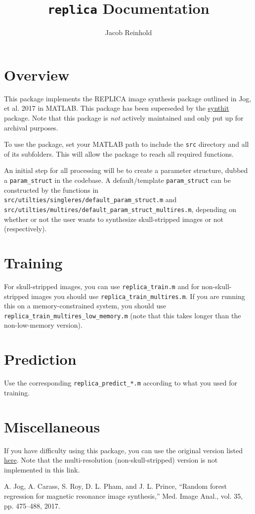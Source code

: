 \documentclass[12pt]{article}
\title{\texttt{replica} Documentation}
\author{Jacob Reinhold}
\begin{document}
\maketitle

\section{Overview}

This package implements the REPLICA image synthesis package outlined in Jog, et
al. 2017 \cite{jog} in MATLAB. This package has been superseded by the
\href{https://github.com/jcreinhold/synthit}{synthit} package. Note that this
package is \emph{not} actively maintained and only put up for archival purposes.

To use the package, set your MATLAB path to include the \texttt{src} directory
and all of its subfolders. This will allow the package to reach all required 
functions.

An initial step for all processing will be to create a parameter structure,
dubbed a \texttt{param\_struct} in the codebase. A default/template
\texttt{param\_struct} can be constructed by the functions in
\texttt{src/utilties/singleres/default\_param\_struct.m} and 
\texttt{src/utilties/multires/default\_param\_struct\_multires.m}, depending on
whether or not the user wants to synthesize skull-stripped images or not
(respectively).

\section{Training}

For skull-stripped images, you can use \texttt{replica\_train.m} and for
non-skull-stripped images you should use \texttt{replica\_train\_multires.m}. If
you are running this on a memory-constrained system, you should use
\texttt{replica\_train\_multires\_low\_memory.m} (note that this takes longer
than the non-low-memory version).

\section{Prediction}

Use the corresponding \texttt{replica\_predict\_*.m} according to what you used
for training.

\section{Miscellaneous}

If you have difficulty using this package, you can use the original version
listed \href{https://www.nitrc.org/frs/?group_id=834}{here}. Note that the
multi-resolution (non-skull-stripped) version is not implemented in this link.

\begin{thebibliography}{9}
 A. Jog, A. Carass, S. Roy, D. L. Pham, and J. L. Prince, 
``Random forest regression for magnetic resonance image synthesis,'' 
Med. Image Anal., vol. 35, pp. 475–488, 2017.
\end{thebibliography}
\end{document}
